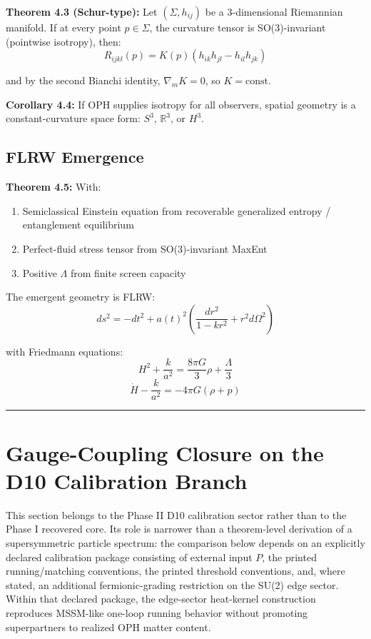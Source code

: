 \textbf{Theorem 4.3 (Schur-type):} Let \((\Sigma, h_{ij})\) be a 3-dimensional Riemannian manifold. If at every point \(p \in \Sigma\), the curvature tensor is SO(3)-invariant (pointwise isotropy), then: \[R_{ijkl}(p) = K(p)(h_{ik}h_{jl} - h_{il}h_{jk})\]

and by the second Bianchi identity, \(\nabla_m K = 0\), so \(K = \text{const}\).

\textbf{Corollary 4.4:} If OPH supplies isotropy for all observers, spatial geometry is a constant-curvature space form: \(S^3\), \(\mathbb{R}^3\), or \(H^3\).

\subsection{FLRW Emergence}\label{44-flrw-emergence}

\textbf{Theorem 4.5:} With:

\begin{enumerate}
\def\labelenumi{\arabic{enumi}.}
\tightlist
\item
 Semiclassical Einstein equation from recoverable generalized entropy / entanglement equilibrium
\item
 Perfect-fluid stress tensor from SO(3)-invariant MaxEnt
\item
 Positive \(\Lambda\) from finite screen capacity
\end{enumerate}

The emergent geometry is FLRW: \[ds^2 = -dt^2 + a(t)^2 \left(\frac{dr^2}{1-kr^2} + r^2 d\Omega^2\right)\]

with Friedmann equations: \[H^2 + \frac{k}{a^2} = \frac{8\pi G}{3}\rho + \frac{\Lambda}{3}\] \[\dot{H} - \frac{k}{a^2} = -4\pi G(\rho + p)\]

\begin{center}\rule{0.5\linewidth}{0.5pt}\end{center}

\section{Gauge-Coupling Closure on the D10 Calibration Branch}\label{5-supersymmetry-and-gauge-coupling-unification}

This section belongs to the Phase II D10 calibration sector rather than to the Phase I recovered core. Its role is narrower than a theorem-level derivation of a supersymmetric particle spectrum: the comparison below depends on an explicitly declared calibration package consisting of external input \(P\), the printed running/matching conventions, the printed threshold conventions, and, where stated, an additional fermionic-grading restriction on the SU(2) edge sector. Within that declared package, the edge-sector heat-kernel construction reproduces MSSM-like one-loop running behavior without promoting superpartners to realized OPH matter content.

